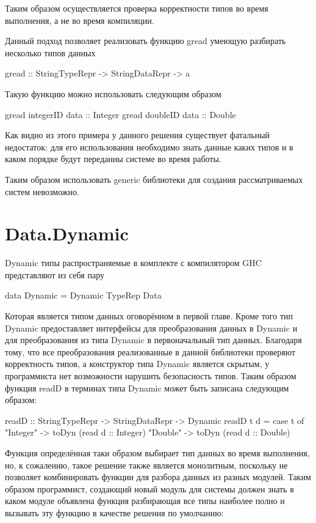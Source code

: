 Таким образом осуществляется проверка корректности типов во время
выполнения, а не во время компиляции.

Данный подход позволяет реализовать функцию gread умеющую разбирать
несколько типов данных
\begin{code}
  gread :: StringTypeRepr -> StringDataRepr -> a
\end{code}

Такую функцию можно использовать следующим образом
\begin{code}
  gread integerID data :: Integer
  gread doubleID  data :: Double
\end{code}

Как видно из этого примера у данного решения существует фатальный
недостаток: для его использования необходимо знать данные каких типов
и в каком порядке будут переданны системе во время работы.

Таким образом использовать generic библиотеки для создания
рассматриваемых систем невозможно.

\section{Data.Dynamic}

Dynamic типы распространяемые в комплекте с компилятором GHC
представляют из себя пару

\begin{code}
  data Dynamic = Dynamic TypeRep Data
\end{code}

Которая является типом данных оговорённом в первой главе. Кроме того
тип Dynamic предоставляет интерфейсы для преобразования данных в
Dynamic и для преобразования из типа Dynamic в первоначальный тип
данных. Благодаря тому, что все преобразования реализованные в данной
библиотеки проверяют корректность типов, а конструктор типа Dynamic
является скрытым, у программиста нет возможности нарушить безопасность
типов. Таким образом функция readD в терминах типа Dynamic может быть
записана следующим образом:

\begin{code}
  readD :: StringTypeRepr -> StringDataRepr -> Dynamic
  readD t d = case t of
                "Integer" -> toDyn (read d :: Integer)
                "Double"  -> toDyn (read d :: Double)
\end{code}

Функция определённая таки образом выбирает тип данных во время
выполнения, но, к сожалению, такое решение также является монолитным,
поскольку не позволяет комбинировать функции для разбора данных из
разных модулей. Таким образом программист, создающий новый модуль для
системы должен знать в каком модуле объявлена функция разбирающая все
типы наиболее полно и вызывать эту функцию в качестве решения по
умолчанию:

